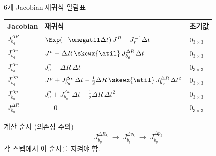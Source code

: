 \begin{frame}[shrink=10]{6개 Jacobian 재귀식 일람표}

  \begin{center}\small
  \renewcommand{\arraystretch}{2.0}
  \begin{tabular}{l|l|l}
    \toprule
    Jacobian & 재귀식 & 초기값 \\
    \midrule
    $J_{b_g}^{\Delta R}$
      & $\Exp(-\omegatil\Delta t)\,J^R - J_r^{-1}\Delta t$
      & $0_{3\times 3}$ \\
    $J_{b_g}^{\Delta v}$
      & $J^v - \Delta R\,\skewx{\atil}\,J_{b_g}^{\Delta R}\,\Delta t$
      & $0_{3\times 3}$ \\
    $J_{b_a}^{\Delta v}$
      & $J^v_a - \Delta R\,\Delta t$
      & $0_{3\times 3}$ \\
    $J_{b_g}^{\Delta p}$
      & $J^p + J_{b_g}^{\Delta v}\,\Delta t - \tfrac{1}{2}\Delta R\,\skewx{\atil}\,J_{b_g}^{\Delta R}\,\Delta t^2$
      & $0_{3\times 3}$ \\
    $J_{b_a}^{\Delta p}$
      & $J^p_a + J_{b_a}^{\Delta v}\,\Delta t - \tfrac{1}{2}\Delta R\,\Delta t^2$
      & $0_{3\times 3}$ \\
    $J_{b_a}^{\Delta R}$
      & $= 0$
      & $0_{3\times 3}$ \\
    \bottomrule
  \end{tabular}
  \end{center}

  \pause
  \vspace{0.3em}
  \begin{exampleblock}{계산 순서 (의존성 주의)}
    \[
      J_{b_g}^{\Delta R_k}
      \;\longrightarrow\;
      J_{b_g}^{\Delta v_k}
      \;\longrightarrow\;
      J_{b_g}^{\Delta p_k}
    \]
    각 스텝에서 이 순서를 지켜야 함.
  \end{exampleblock}
\end{frame}

